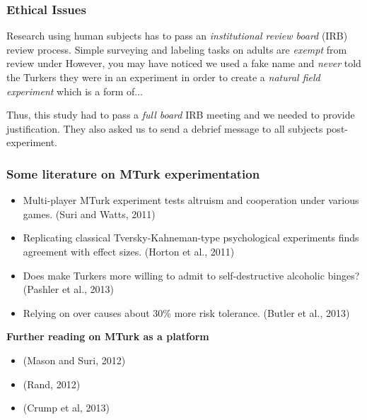 \documentclass[slides]{beamer} %
\begin{document}
\begin{frame}\frametitle{Ethical Issues}

Research using human subjects has to pass an \textit{institutional review board} (IRB) review process. Simple surveying and labeling tasks on adults are \textit{exempt} from review under   \pause However, you may have noticed we used a fake name and \textit{never} told the Turkers they were in an experiment in order to create a \textit{natural field experiment} which is a form of...

 \pause 

Thus, this study had to pass a \textit{full board} IRB meeting and we needed to provide justification. \pause  They also asked us to send a debrief message to all subjects post-experiment.

\end{frame}

\begin{frame}\frametitle{Some literature on MTurk experimentation}

\scriptsize 
\vspace{0.2cm}

\begin{itemize}
\item Multi-player MTurk experiment tests altruism and cooperation under various  games. (Suri and Watts, 2011) \pause
\item Replicating classical Tversky-Kahneman-type psychological experiments finds agreement with effect sizes. (Horton et al., 2011)  \pause
\item Does  make Turkers more willing to admit to self-destructive alcoholic binges? (Pashler et al., 2013)  \pause
\item Relying on  over  causes about 30\% more risk tolerance. (Butler et al., 2013) \pause
\end{itemize}
\vspace{0.2cm}

\textbf{Further reading on MTurk as a platform}

\begin{itemize}
\scriptsize
\item {} (Mason and Suri, 2012)
\item {} (Rand, 2012)
\item {} (Crump et al, 2013)
\end{itemize}

\end{frame}
\end{document}

